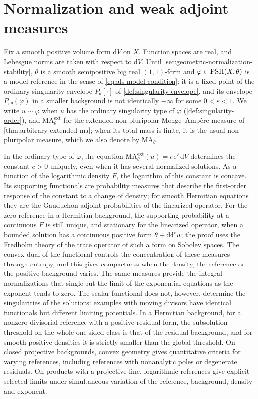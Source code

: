 \chapter{Normalization and weak adjoint measures}
\label{chap:normalization}

Fix a smooth positive volume form $\mathrm{d}V$ on $X$. Function spaces are real, and Lebesgue norms are taken with respect to $\mathrm{d}V$. Until \cref{sec:geometric-normalization-stability}, $\theta$ is a smooth semipositive big real $(1,1)$-form and $\varphi\in\mathrm{PSH}(X,\theta)$ is a model reference in the sense of \eqref{eq:als-model-condition}: it is a fixed point of the ordinary singularity envelope $P_\theta[\cdot]$ of \cref{def:singularity-envelope}, and its envelope $P_{\varepsilon\theta}(\varphi)$ in a smaller background is not identically $-\infty$ for some $0<\varepsilon<1$. We write $u\sim\varphi$ when $u$ has the ordinary singularity type of $\varphi$ (\cref{def:singularity-order}), and $\mathrm{MA}^{\mathrm{ext}}_\theta$ for the extended non-pluripolar Monge--Amp\`ere measure of \cref{thm:arbitrary-extended-ma}; when its total mass is finite, it is the usual non-pluripolar measure, which we also denote by $\mathrm{MA}_\theta$.

In the ordinary type of $\varphi$, the equation $\mathrm{MA}^{\mathrm{ext}}_\theta(u)=c\,\mathrm{e}^F\mathrm{d}V$ determines the constant $c>0$ uniquely, even when it has several normalized solutions. As a function of the logarithmic density $F$, the logarithm of this constant is concave. Its supporting functionals are probability measures that describe the first-order response of the constant to a change of density; for smooth Hermitian equations they are the Gauduchon adjoint probabilities of the linearized operator. For the zero reference in a Hermitian background, the supporting probability at a continuous $F$ is still unique, and stationary for the linearized operator, when a bounded solution has a continuous positive form $\theta+\mathrm{dd}^{\mathrm{c}} u$; the proof uses the Fredholm theory of the trace operator of such a form on Sobolev spaces. The convex dual of the functional controls the concentration of these measures through entropy, and this gives compactness when the density, the reference or the positive background varies. The same measures provide the integral normalizations that single out the limit of the exponential equations as the exponent tends to zero. The scalar functional does not, however, determine the singularities of the solutions: examples with moving divisors have identical functionals but different limiting potentials. In a Hermitian background, for a nonzero divisorial reference with a positive residual form, the subsolution threshold on the whole one-sided class is that of the residual background, and for smooth positive densities it is strictly smaller than the global threshold. On closed projective backgrounds, convex geometry gives quantitative criteria for varying references, including references with nonanalytic poles or degenerate residuals. On products with a projective line, logarithmic references give explicit selected limits under simultaneous variation of the reference, background, density and exponent.

